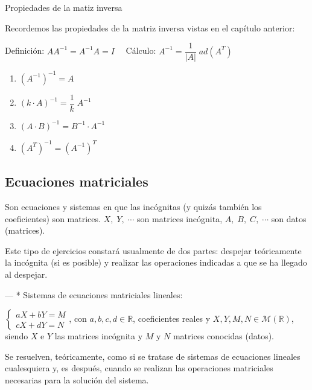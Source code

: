 \begin{teor}{Propiedades de la matiz inversa}

Recordemos las propiedades de la matriz inversa vistas en el capítulo anterior:

Definición:  $AA^{-1}=A^{-1}A=I\quad $
Cálculo: $A^{-1}=\dfrac 1 {|A|}\; ad(A^T)$

\begin{multicols}{2}
\begin{enumerate}
\item $(A^{-1})^{-1}=A$
\item $(k\cdot A)^{-1}= \dfrac 1 k \; A^{-1}$
\item $(A\cdot B)^{-1}=B^{-1} \cdot A^{-1}$
\item $(A^T)^{-1}=(A^{-1})^T$
\end{enumerate}
\end{multicols}
\end{teor}

\subsection{Ecuaciones matriciales}

Son ecuaciones y sistemas en que las incógnitas (y quizás también los coeficientes) son matrices. $X,\; Y, \; \cdots $ son matrices incógnita, $A,\; B, \; C, \; \cdots $ son datos (matrices).

Este tipo de ejercicios constará usualmente  de dos partes: despejar teóricamente la incógnita (si es posible) y realizar las operaciones indicadas a que se ha llegado al despejar.

--- * Sistemas de ecuaciones matriciales lineales:

$\begin{cases} aX+bY=M\\cX+dY=N \end{cases}$, con $a,b,c,d \in \mathbb R$, coeficientes reales y $X,Y,M,N \in \mathcal M (\mathbb R)$, siendo $X$ e $Y$ las matrices incógnita y $M$ y $N$ matrices conocidas (datos).

Se resuelven, teóricamente, como si se tratase de sistemas de ecuaciones lineales cualesquiera y, es después, cuando se realizan las operaciones matriciales necesarias para la solución del sistema.


